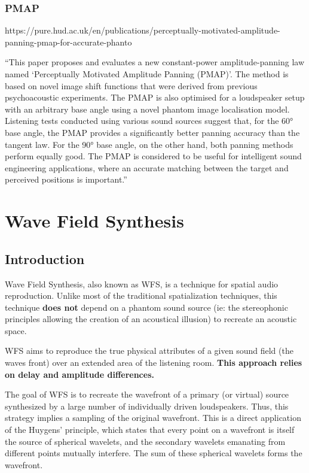 \documentclass[
  letterpaper,
  DIV=11,
  numbers=noendperiod]{scrreport}
\begin{document}
\hypertarget{pmap}{%
\subsection{PMAP}\label{pmap}}

https://pure.hud.ac.uk/en/publications/perceptually-motivated-amplitude-panning-pmap-for-accurate-phanto

``This paper proposes and evaluates a new constant-power
amplitude-panning law named `Perceptually Motivated Amplitude Panning
(PMAP)'. The method is based on novel image shift functions that were
derived from previous psychoacoustic experiments. The PMAP is also
optimised for a loudspeaker setup with an arbitrary base angle using a
novel phantom image localisation model. Listening tests conducted using
various sound sources suggest that, for the 60° base angle, the PMAP
provides a significantly better panning accuracy than the tangent law.
For the 90° base angle, on the other hand, both panning methods perform
equally good. The PMAP is considered to be useful for intelligent sound
engineering applications, where an accurate matching between the target
and perceived positions is important.''

\hypertarget{wave-field-synthesis}{%
\chapter{Wave Field Synthesis}\label{wave-field-synthesis}}

\hypertarget{introduction-1}{%
\section{Introduction}\label{introduction-1}}

Wave Field Synthesis, also known as WFS, is a technique for spatial
audio reproduction. Unlike most of the traditional spatialization
techniques, this technique \textbf{does not} depend on a phantom sound
source (ie: the stereophonic principles allowing the creation of an
acoustical illusion) to recreate an acoustic space.

WFS aims to reproduce the true physical attributes of a given sound
field (the waves front) over an extended area of the listening room.
\textbf{This approach relies on delay and amplitude differences.}

The goal of WFS is to recreate the wavefront of a primary (or virtual)
source synthesized by a large number of individually driven
loudspeakers. Thus, this strategy implies a sampling of the original
wavefront. This is a direct application of the Huygens' principle, which
states that every point on a wavefront is itself the source of spherical
wavelets, and the secondary wavelets emanating from different points
mutually interfere. The sum of these spherical wavelets forms the
wavefront.
\end{document}
